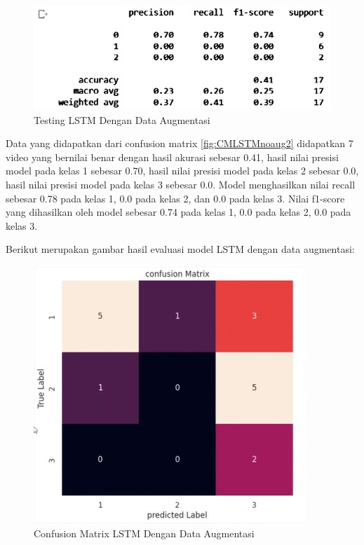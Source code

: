 \begin{figure} [ht] \centering
  \includegraphics[scale=0.55]{gambar/scoreLSTMnoaug2.png}
  \caption{Testing LSTM Dengan Data Augmentasi}
  \label{fig:ScoreLSTMnoaug2}
\end{figure}
Data yang didapatkan dari confusion matrix \ref{fig:CMLSTMnoaug2} didapatkan 7 video yang bernilai benar
dengan hasil akurasi sebesar 0.41, hasil nilai presisi model pada kelas 1 sebesar 0.70, hasil nilai
presisi model pada kelas 2 sebesar 0.0, hasil nilai presisi model pada kelas 3 sebesar 0.0. Model menghasilkan
nilai recall sebesar 0.78 pada kelas 1, 0.0 pada kelas 2, dan 0.0 pada kelas 3. Nilai f1-score yang dihasilkan
oleh model sebesar 0.74 pada kelas 1, 0.0 pada kelas 2, 0.0 pada kelas 3.

Berikut merupakan gambar hasil evaluasi model LSTM dengan data augmentasi:
\newpage
\begin{figure} [ht] \centering
  \includegraphics[scale=1.3]{gambar/CMLSTMaug2.png}
  \caption{Confusion Matrix LSTM Dengan Data Augmentasi}
  \label{fig:CMLSTMaug2}
\end{figure}

